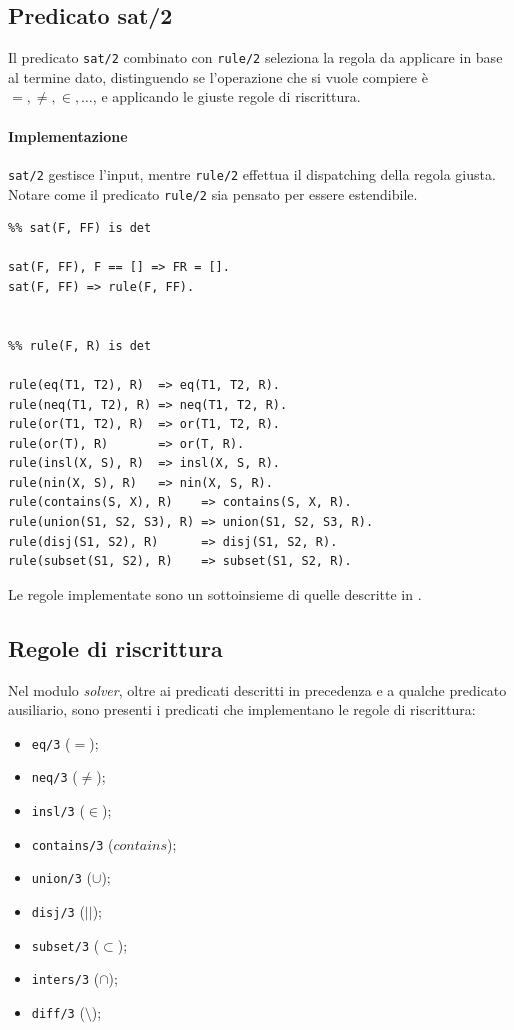 \documentclass[12pt,a4paper,openright]{book} %
\begin{document}
\subsection{Predicato sat/2}
Il predicato \verb|sat/2| combinato con \verb|rule/2| seleziona la regola da applicare in base al termine dato, distinguendo se l'operazione che si vuole compiere è $=, \neq, \in, \ldots$, e applicando le giuste regole di riscrittura. 

\paragraph{Implementazione} \verb|sat/2| gestisce l'input, mentre \verb|rule/2| effettua il dispatching della regola giusta. Notare come il predicato \verb|rule/2| sia pensato per essere estendibile.
\begin{verbatim}
%% sat(F, FF) is det

sat(F, FF), F == [] => FR = [].
sat(F, FF) => rule(F, FF).


%% rule(F, R) is det

rule(eq(T1, T2), R)  => eq(T1, T2, R).
rule(neq(T1, T2), R) => neq(T1, T2, R).
rule(or(T1, T2), R)  => or(T1, T2, R).
rule(or(T), R)       => or(T, R).
rule(insl(X, S), R)  => insl(X, S, R).
rule(nin(X, S), R)   => nin(X, S, R).
rule(contains(S, X), R)    => contains(S, X, R).
rule(union(S1, S2, S3), R) => union(S1, S2, S3, R).
rule(disj(S1, S2), R)      => disj(S1, S2, R).
rule(subset(S1, S2), R)    => subset(S1, S2, R).
\end{verbatim}

Le regole implementate sono un sottoinsieme di quelle descritte in \cite{Rossi18}.

\subsection{Regole di riscrittura}

Nel modulo \emph{solver}, oltre ai predicati descritti in precedenza e a qualche predicato ausiliario, sono presenti i predicati che implementano le regole di riscrittura:
\begin{itemize}
\item \verb|eq/3| ($=$);
\item \verb|neq/3| ($\neq$);
\item \verb|insl/3| ($\in$);
\item \verb|contains/3| ($contains$);
\item \verb|union/3| ($\cup$);
\item \verb|disj/3| ($||$);
\item \verb|subset/3| ($\subset$);
\item \verb|inters/3| ($\cap$);
\item \verb|diff/3| ($\setminus$);
\end{itemize}
\end{document}
